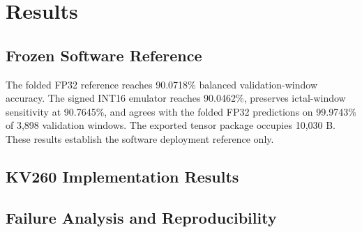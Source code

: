 \section{Results}

\subsection{Frozen Software Reference}

The folded FP32 reference reaches 90.0718\% balanced validation-window
accuracy. The signed INT16 emulator reaches 90.0462\%, preserves ictal-window
sensitivity at 90.7645\%, and agrees with the folded FP32 predictions on
99.9743\% of 3,898 validation windows. The exported tensor package occupies
10,030 B. These results establish the software deployment reference only.

\subsection{KV260 Implementation Results}




\subsection{Failure Analysis and Reproducibility}

